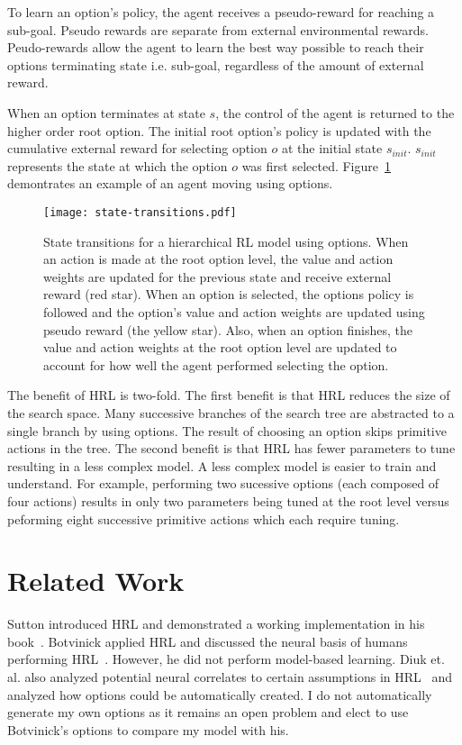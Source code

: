 To learn an option's policy, the agent receives a pseudo-reward for reaching a sub-goal. Pseudo rewards are separate from external environmental rewards. Peudo-rewards allow the agent to learn the best way possible to reach their options terminating state i.e. sub-goal, regardless of the amount of external reward.

When an option terminates at state $s$, the control of the agent is returned to the higher order root option. The initial root option's policy is updated with the cumulative external reward for selecting option $o$ at the initial state $s_{init}$. $s_{init}$ represents the state at which the option $o$ was first selected. Figure~\ref{fig:state-transitions} demontrates an example of an agent moving using options.

\begin{figure}[h]
\centering
\texttt{[image: state-transitions.pdf]}
\caption{State transitions for a hierarchical RL model using options. When an action is made at the root option level, the value and action weights are updated for the previous state and receive external reward (red star). When an option is selected, the options policy is followed and the option's value and action weights are updated using pseudo reward (the yellow star). Also, when an option finishes, the value and action weights at the root option level are updated to account for how well the agent performed selecting the option.}
\label{fig:state-transitions}
\end{figure}

The benefit of HRL is two-fold. The first benefit is that HRL reduces the size of the search space. Many successive branches of the search tree are abstracted to a single branch by using options. The result of choosing an option skips primitive actions in the tree. The second benefit is that HRL has fewer parameters to tune resulting in a less complex model. A less complex model is easier to train and understand. For example, performing two sucessive options (each composed of four actions) results in only two parameters being tuned at the root level versus peforming eight successive primitive actions which each require tuning.

\section{Related Work}
Sutton introduced HRL and demonstrated a working implementation in his book~\cite{sutton1999between}. Botvinick applied HRL and discussed the neural basis of humans performing HRL~\cite{botvinick2009hierarchically}. However, he did not perform model-based learning. Diuk et. al. also analyzed potential neural correlates to certain assumptions in HRL~\cite{diuk2013divide} and analyzed how options could be automatically created. I do not automatically generate my own options as it remains an open problem and elect to use Botvinick's options to compare my model with his.

